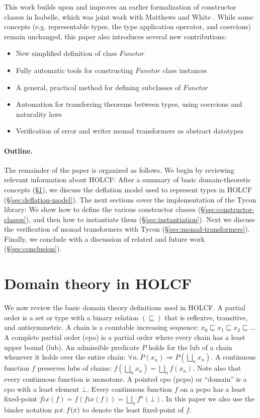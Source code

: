 \documentclass{sigplanconf}
\newcommand{\below}{\sqsubseteq}
\newcommand{\hair}{\mskip1mu}
\newcommand{\hsc}[1]{\ensuremath{\mathit{#1}}}
\theoremstyle{definition}
\begin{document}
This work builds upon and improves an earlier formalization of constructor classes in Isabelle, which was joint work with Matthews and White \cite{HMW2005}. While some concepts (e.g. representable types, the type application operator, and coercions) remain unchanged, this paper also introduces several new contributions:

\begin{itemize}
\item New simplified definition of class \hsc{Functor}
\item Fully automatic tools for constructing \hsc{Functor} class instances
\item A general, practical method for defining subclasses of \hsc{Functor}
\item Automation for transferring theorems between types, using coercions and naturality laws
\item Verification of error and writer monad transformers as abstract datatypes
\end{itemize}

\paragraph{Outline.}

The remainder of the paper is organized as follows. We begin by reviewing relevant information about HOLCF: After a summary of basic domain-theoretic concepts (\S\ref{sec:holcf}), we discuss the deflation model used to represent types in HOLCF (\S\ref{sec:deflation-model}). The next sections cover the implementation of the Tycon library: We show how to define the various constructor classes (\S\ref{sec:constructor-classes}), and then how to instantiate them (\S\ref{sec:instantiation}). Next we discuss the verification of monad transformers with Tycon (\S\ref{sec:monad-transformers}). Finally, we conclude with a discussion of related and future work (\S\ref{sec:conclusion}).

\section{Domain theory in HOLCF}
\label{sec:holcf}

We now review the basic domain theory definitions used in HOLCF. A partial order is a set or type with a binary relation $(\below)$ that is reflexive, transitive, and antisymmetric. A chain is a countable increasing sequence: $x_0 \below x_1 \below x_2 \below \dots$ A complete partial order (cpo) is a partial order where every chain has a least upper bound (lub). An admissible predicate $P$ holds for the lub of a chain whenever it holds over the entire chain: $\forall{n}.\,P(x_n) \Longrightarrow P\left(\bigsqcup_n x_n\right)$. A continuous function $f$ preserves lubs of chains: $f\left(\bigsqcup_n x_n\right) = \bigsqcup_n f(x_n)$. Note also that every continuous function is monotone. A pointed cpo (pcpo) or ``domain'' is a cpo with a least element $\bot$. Every continuous function $f$ on a pcpo has a least fixed-point $\mathit{fix}(f) = f(\mathit{fix}(f)) = \bigsqcup_n f^n(\bot)$. In this paper we also use the binder notation $\mu\hair{x}.\,f(x)$ to denote the least fixed-point of $f$.
\end{document}
